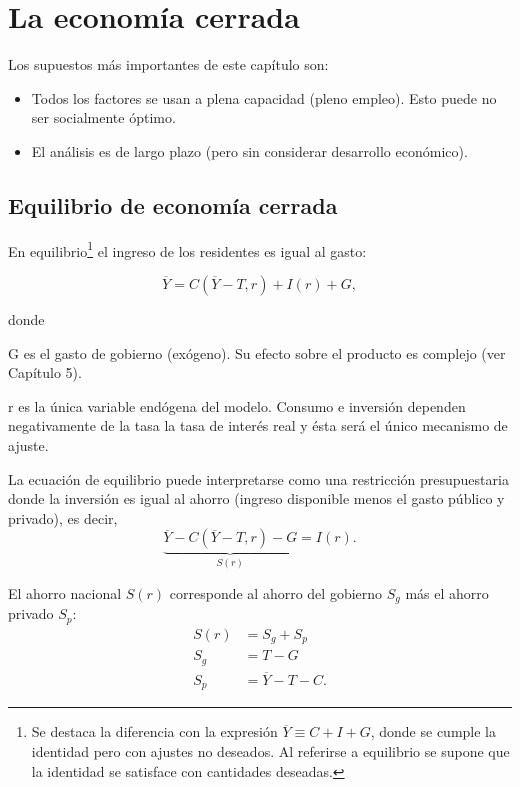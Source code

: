 \documentclass[DeGregorioResumen]{subfiles}
\begin{document}
\section{La economía cerrada}
Los supuestos más importantes de este capítulo son:
\begin{itemize}
\item Todos los factores se usan a plena capacidad (pleno empleo). Esto puede no ser socialmente óptimo.
\item El análisis es de largo plazo (pero sin considerar desarrollo económico).
\end{itemize}

\subsection{Equilibrio de economía cerrada}
En equilibrio\footnote{Se destaca la diferencia con la expresión $\overline{Y}\equiv C+I+G$, donde se cumple la identidad pero con ajustes no deseados. Al referirse a equilibrio se supone que la identidad se satisface con cantidades deseadas.} el ingreso de los residentes es igual al gasto:

\begin{equation}
\overline{Y}=C(\overline{Y}-T, r)+I(r)+G,
\label{eq:eq_econ_cerrada}
\end{equation}

donde
\begin{where}
\item[G] es el gasto de gobierno (exógeno). Su efecto sobre el producto es complejo (ver Capítulo 5).
\item[r] es la única variable endógena del modelo. Consumo e inversión dependen negativamente de la tasa la tasa de interés real y ésta será el único mecanismo de ajuste.
\end{where}

La ecuación de equilibrio puede interpretarse como una restricción presupuestaria donde la inversión es igual al ahorro (ingreso disponible menos el gasto público y privado), es decir,
\begin{equation}
\underbrace{\overline{Y}-C(\overline{Y}-T, r)-G}_{S(r)}=I(r).
\end{equation}

El ahorro nacional $S(r)$ corresponde al ahorro del gobierno $S_g$ más el ahorro privado $S_p$:
\begin{align*}
S(r)&=S_g+S_p \\
S_g&=T-G \\
S_p&=\overline{Y}-T-C.
\end{align*}
\end{document}
